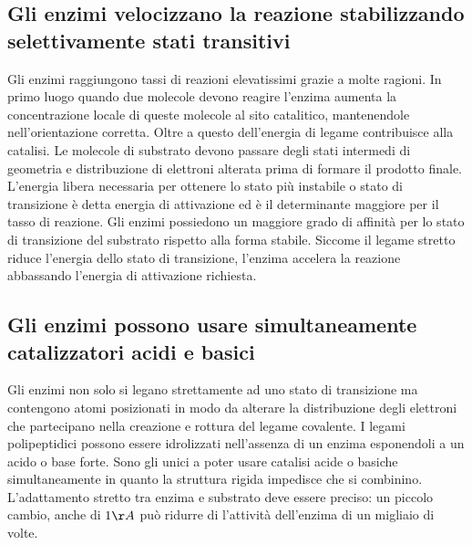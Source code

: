 \subsection{Gli enzimi velocizzano la reazione stabilizzando selettivamente stati transitivi}
Gli enzimi raggiungono tassi di reazioni elevatissimi grazie a molte ragioni. In primo luogo quando due molecole devono reagire l'enzima aumenta la concentrazione locale di queste 
molecole al sito catalitico, mantenendole nell'orientazione corretta. Oltre a questo dell'energia di legame contribuisce alla catalisi. Le molecole di substrato devono passare degli 
stati intermedi di geometria e distribuzione di elettroni alterata prima di formare il prodotto finale. L'energia libera necessaria per ottenere lo stato pi\`u instabile o stato di
transizione \`e detta energia di attivazione ed \`e il determinante maggiore per il tasso di reazione. Gli enzimi possiedono un maggiore grado di affinit\`a per lo stato di transizione
del substrato rispetto alla forma stabile. Siccome il legame stretto riduce l'energia dello stato di transizione, l'enzima accelera la reazione abbassando l'energia di attivazione 
richiesta.
\subsection{Gli enzimi possono usare simultaneamente catalizzatori acidi e basici}
Gli enzimi non solo si legano strettamente ad uno stato di transizione ma contengono atomi posizionati in modo da alterare la distribuzione degli elettroni che partecipano nella 
creazione e rottura del legame covalente. I legami polipeptidici possono essere idrolizzati nell'assenza di un enzima esponendoli a un acido o base forte. Sono gli unici a poter usare 
catalisi acide o basiche simultaneamente in quanto la struttura rigida impedisce che si combinino. L'adattamento stretto tra enzima e substrato deve essere preciso: un piccolo cambio, 
anche di $1\AA$ pu\`o ridurre di l'attivit\`a dell'enzima di un migliaio di volte.
